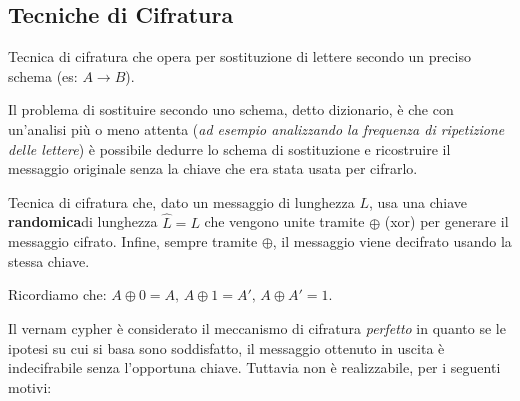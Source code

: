 \subsection{Tecniche di Cifratura}
\begin{proposition}
Tecnica di cifratura che opera per sostituzione di lettere secondo un preciso schema (es: $A\rightarrow{B}$).
\end{proposition}
Il problema di sostituire secondo uno schema, detto dizionario, è che con un'analisi più o meno attenta (\emph{ad esempio analizzando la frequenza di ripetizione delle lettere}) è possibile dedurre lo schema di sostituzione e ricostruire il messaggio originale senza la chiave che era stata usata per cifrarlo. 
\begin{proposition}\label{prop:vernam}
Tecnica di cifratura che, dato un messaggio di lunghezza $L$, usa una chiave \textbf{randomica}\footnotemark di lunghezza $\hat{L}=L$ che vengono unite tramite $\oplus$ (xor) per generare il messaggio cifrato. Infine, sempre tramite $\oplus$, il messaggio viene decifrato usando la stessa chiave.
\end{proposition}
\begin{property}[XOR]
Ricordiamo che: $A\oplus{0} = A,\,A\oplus{1} = A',\, A\oplus{A'} = 1$.
\end{property}
Il vernam cypher è considerato il meccanismo di cifratura \emph{perfetto} in quanto se le ipotesi su cui si basa sono soddisfatto, il messaggio ottenuto in uscita è indecifrabile senza l'opportuna chiave. Tuttavia non è realizzabile, per i seguenti motivi:
